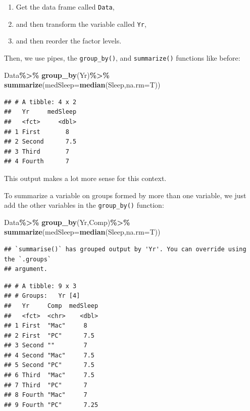 \documentclass[
]{book}
\newenvironment{Shaded}{\begin{snugshade}}{\end{snugshade}}
\newcommand{\AttributeTok}[1]{\textcolor[rgb]{0.13,0.29,0.53}{#1}}
\newcommand{\FunctionTok}[1]{\textcolor[rgb]{0.13,0.29,0.53}{\textbf{#1}}}
\newcommand{\NormalTok}[1]{#1}
\newcommand{\SpecialCharTok}[1]{\textcolor[rgb]{0.81,0.36,0.00}{\textbf{#1}}}
\providecommand{\tightlist}{%
  \setlength{\itemsep}{0pt}\setlength{\parskip}{0pt}}
\begin{document}
\begin{enumerate}
\def\labelenumi{\arabic{enumi}.}
\tightlist
\item
  Get the data frame called \texttt{Data},
\item
  and then transform the variable called \texttt{Yr},
\item
  and then reorder the factor levels.
\end{enumerate}

Then, we use pipes, the \texttt{group\_by()}, and \texttt{summarize()} functions like before:

\begin{Shaded}
\begin{Highlighting}[]
\NormalTok{Data}\SpecialCharTok{\%\textgreater{}\%}
  \FunctionTok{group\_by}\NormalTok{(Yr)}\SpecialCharTok{\%\textgreater{}\%}
  \FunctionTok{summarize}\NormalTok{(}\AttributeTok{medSleep=}\FunctionTok{median}\NormalTok{(Sleep,}\AttributeTok{na.rm=}\NormalTok{T))}
\end{Highlighting}
\end{Shaded}

\begin{verbatim}
## # A tibble: 4 x 2
##   Yr     medSleep
##   <fct>     <dbl>
## 1 First       8  
## 2 Second      7.5
## 3 Third       7  
## 4 Fourth      7
\end{verbatim}

This output makes a lot more sense for this context.

To summarize a variable on groups formed by more than one variable, we just add the other variables in the \texttt{group\_by()} function:

\begin{Shaded}
\begin{Highlighting}[]
\NormalTok{Data}\SpecialCharTok{\%\textgreater{}\%}
  \FunctionTok{group\_by}\NormalTok{(Yr,Comp)}\SpecialCharTok{\%\textgreater{}\%}
  \FunctionTok{summarize}\NormalTok{(}\AttributeTok{medSleep=}\FunctionTok{median}\NormalTok{(Sleep,}\AttributeTok{na.rm=}\NormalTok{T))}
\end{Highlighting}
\end{Shaded}

\begin{verbatim}
## `summarise()` has grouped output by 'Yr'. You can override using the `.groups`
## argument.
\end{verbatim}

\begin{verbatim}
## # A tibble: 9 x 3
## # Groups:   Yr [4]
##   Yr     Comp  medSleep
##   <fct>  <chr>    <dbl>
## 1 First  "Mac"     8   
## 2 First  "PC"      7.5 
## 3 Second ""        7   
## 4 Second "Mac"     7.5 
## 5 Second "PC"      7.5 
## 6 Third  "Mac"     7.5 
## 7 Third  "PC"      7   
## 8 Fourth "Mac"     7   
## 9 Fourth "PC"      7.25
\end{verbatim}
\end{document}
